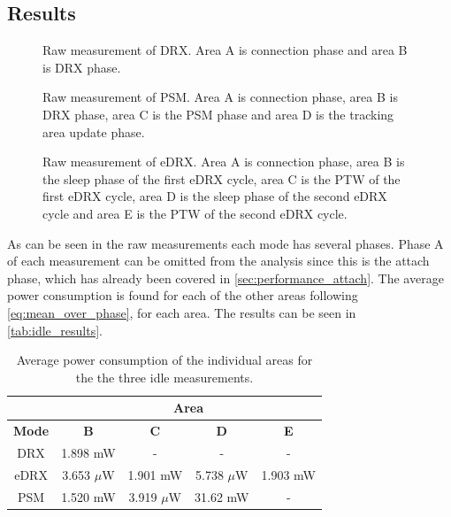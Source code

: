 \subsection{Results}
\begin{minipage}{0.48\textwidth}
\begin{figure}[H]
\centering
\resizebox{\textwidth}{!}{
}
\caption{Raw measurement of \gls{DRX}. Area A is connection phase and area B is DRX phase.}
\label{fig:DRX}
\end{figure}
\vspace{0.8em}
\end{minipage}%
\hfill
\begin{minipage}{0.48\textwidth}
\begin{figure}[H]
\centering
\resizebox{\textwidth}{!}{
}
\caption{Raw measurement of \gls{PSM}. Area A is connection phase, area B is DRX phase, area C is the PSM phase and area D is the tracking area update phase.}
\label{fig:PSM}
\end{figure}
\end{minipage}
\vspace{1em}
\begin{figure}[H]
\centering
\begin{minipage}{0.48\textwidth}
\resizebox{\textwidth}{!}{
}
\caption{Raw measurement of \gls{eDRX}. Area A is connection phase, area B is the sleep phase of the first eDRX cycle, area C is the \gls{PTW} of the first eDRX cycle, area D is the sleep phase of the second eDRX cycle and area E is the \gls{PTW} of the second eDRX cycle.}
\label{fig:eDRX1}
\end{minipage}
\end{figure}

As can be seen in the raw measurements each mode has several phases. Phase A of each measurement can be omitted from the analysis since this is the attach phase, which has already been covered in \autoref{sec:performance_attach}. The average power consumption is found for each of the other areas following \autoref{eq:mean_over_phase}, for each area. The results can be seen in \autoref{tab:idle_results}.

\begin{table}[H]
\centering
\begin{tabular}{|c|c|c|c|c|} 
\multicolumn{1}{c}{ }	& \multicolumn{4}{c}{Area} \\ \hline
\textbf{Mode}	& \textbf{B}	& \textbf{C} 	& \textbf{D} 	& \textbf{E} \\ \hline
DRX				& 1.898 mW		& - 			& - 			& - \\ \hline
eDRX			& 3.653 $\mu$W	& 1.901 mW		& 5.738 $\mu$W	& 1.903 mW \\ \hline
PSM 			& 1.520 mW		& 3.919 $\mu$W	& 31.62 mW		& - \\ \hline 
\end{tabular}
\caption{Average power consumption of the individual areas for the the three idle measurements.}
\label{tab:idle_results}
\end{table}

